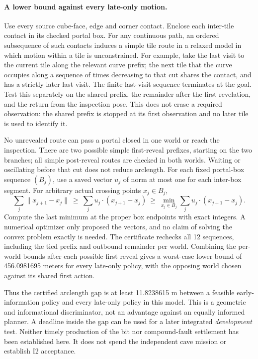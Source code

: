 \documentclass{article}
\begin{document}
\paragraph{A lower bound against every late-only motion.}
Use every source cube-face, edge and corner contact. Enclose
each inter-tile contact in its checked portal box. For any
continuous path, an ordered subsequence of such contacts
induces a simple tile route in a relaxed model in which motion
within a tile is unconstrained. For example, take the last
visit to the current tile along the relevant curve prefix;
the next tile that the curve occupies along a sequence of
times decreasing to that cut shares the contact, and has a
strictly later last visit. The finite last-visit sequence
terminates at the goal. Test this separately on the shared
prefix, the remainder after the first revelation, and the
return from the inspection pose. This does not erase a
required observation: the shared prefix is stopped at its
first observation and no later tile is used to identify it.

No unrevealed route can pass a portal closed in one world
or reach the inspection. There are two possible simple
first-reveal prefixes, starting on the two branches; all
simple post-reveal routes are checked in both worlds. Waiting
or oscillating before that cut does not reduce arclength.
For each fixed portal-box sequence $(B_j)$, use a saved
vector $u_j$ of norm at most one for each inter-box segment.
For arbitrary actual crossing points $x_j\in B_j$,
\[
 \sum_j \|x_{j+1}-x_j\|\ \ge\
 \sum_j u_j\mathbin{\cdot}(x_{j+1}-x_j)\ \ge\
 \min_{x_j\in B_j}\sum_j u_j\mathbin{\cdot}(x_{j+1}-x_j).
\]
Compute the last minimum at the proper box endpoints with
exact integers. A numerical optimizer only proposed the
vectors, and no claim of solving the convex problem exactly
is needed. The certificate rechecks all 12 sequences, including
the tied prefix and outbound remainder per world. Combining
the per-world bounds after each possible first reveal gives
a worst-case lower bound of 456.0981695 meters for every
late-only policy, with the opposing world chosen against
its shared first action.

Thus the certified arclength gap is at least 11.8238615 m
between a feasible early-information policy and every
late-only policy in this model. This is a geometric and
informational discriminator, not an advantage against an
equally informed planner. A deadline inside the gap can be used
for a later integrated \emph{development} test. Neither timely
production of the bit nor compound-fault settlement has been
established here. It does not spend the independent cave mission
or establish I2 acceptance.
\end{document}
